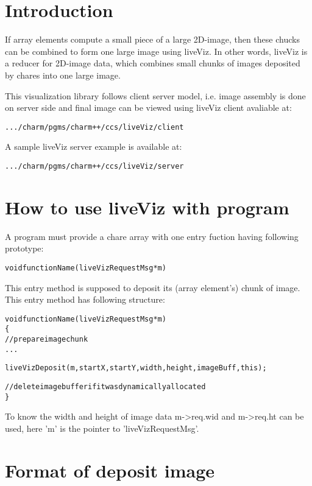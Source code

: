\section{Introduction}

If array elements compute a small piece of a large 2D-image, then these 
chucks can be combined to form one large image using liveViz. In other 
words, liveViz is a reducer for 2D-image data, which combines small chunks
 of images deposited by chares into one large image.

This visualization library follows client server model, i.e. image 
assembly is done on server side and final image can be viewed using 
liveViz client avaliable at:
\begin{alltt}
           .../charm/pgms/charm++/ccs/liveViz/client
\end{alltt}

A sample liveViz server example is available at:
\begin{alltt}
           .../charm/pgms/charm++/ccs/liveViz/server
\end{alltt}

\section{How to use liveViz with \charmpp{} program}

A program must provide a chare array with one entry fuction having 
following prototype:

\begin{alltt}
  void functionName (liveVizRequestMsg *m)
\end{alltt}

This entry method is supposed to deposit its (array element's) chunk of 
image. This entry method has following structure:

\begin{alltt}
  void functionName (liveVizRequestMsg *m)
  \{
    // prepare image chunk
       ...

    liveVizDeposit (m, startX, startY, width, height, imageBuff, this);

    // delete image buffer if it was dynamically allocated
  \}
\end{alltt}

To know the width and height of image data m->req.wid and m->req.ht can 
be used, here 'm' is the pointer to 'liveVizRequestMsg'. 

\section{Format of deposit image}

